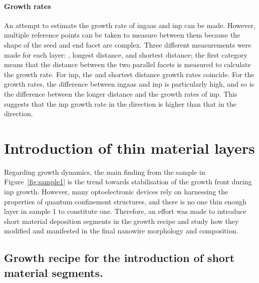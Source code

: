 \paragraph{Growth rates} An attempt to estimate the growth rate of \acs{ingaas} and \acs{inp} can be made. However, multiple reference points can be taken to measure between them because the shape of the seed and end facet are complex. Three different measurements were made for each layer: , longest distance, and shortest distance; the first category means that the distance between the two parallel  facets is measured to calculate the growth rate. For \acs{inp}, the  and shortest distance growth rates coincide. For the  growth rates, the difference between \acs{ingaas} and \acs{inp} is particularly high, and so is the difference between the longer distance and the  growth rates of \acs{inp}. This suggests that the \acs{inp} growth rate in the  direction is higher than that in the  direction.

\section{Introduction of thin material layers}

Regarding growth dynamics, the main finding from the sample in Figure~\ref{fig:sample1} is the trend towards stabilisation of the  growth front during \acs{inp} growth. However, many optoelectronic devices rely on harnessing the properties of quantum confinement structures, and there is no one thin enough layer in sample 1 to constitute one. Therefore, an effort was made to introduce short material deposition segments in the growth recipe and study how they modified and manifested in the final nanowire morphology and composition.

\subsection{Growth recipe for the introduction of short material segments.}

